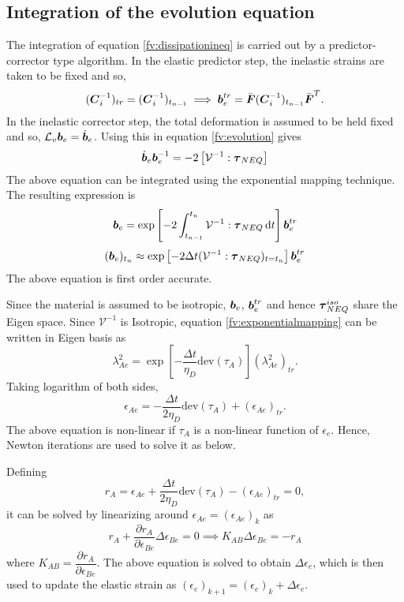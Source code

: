 \documentclass[11pt,twoside,TimesRoman]{article}
\newcommand{\parder}[2]{{\dfrac{\partial #1}{\partial #2}}}
\begin{document}
\subsection{Integration of the evolution equation}
The integration of equation \ref{fv:dissipationineq} is carried out by a predictor-corrector type algorithm. In the elastic predictor step, the inelastic strains are taken to be fixed and so,
\begin{equation}
	(\mbox{\boldmath $C$}_i^{-1})_{tr} = 	(\mbox{\boldmath $C$}_i^{-1})_{t_{n-1}} \implies \mbox{\boldmath $b$}_e^{tr} = \bar{\mbox{\boldmath $F$}} (\mbox{\boldmath $C$}_i^{-1})_{t_{n-1}} \bar{\mbox{\boldmath $F$}}^T.
\end{equation}
In the inelastic corrector step, the total deformation is assumed to be held fixed and so, $\mathcal{L}_v\mbox{\boldmath $b$}_e = \dot{\mbox{\boldmath $b$}}_e$. Using this in equation \ref{fv:evolution} gives
\begin{equation}
	\dot{\mbox{\boldmath $b$}}_e {\mbox{\boldmath $b$}}^{-1}_e = -2 \left[\mathcal{V}^{-1} : \boldsymbol{\tau}_{NEQ} \right]
\end{equation}
The above equation can be integrated using the exponential mapping technique. The resulting expression is 
\begin{equation}
	{\mbox{\boldmath $b$}}_e  = \exp  \left[ -2 \int_{t_{n-1}}^{t_n} \mathcal{V}^{-1} : \boldsymbol{\tau}_{NEQ} \mathop{}\!\mathrm{d} t \right] \mbox{\boldmath $b$}_e^{tr}
\end{equation}
\begin{equation}
	({\mbox{\boldmath $b$}}_e)_{t_n}  \approx \exp  \left[ -2 \Delta t (\mathcal{V}^{-1} : \boldsymbol{\tau}_{NEQ})_{t=t_n} \right] \mbox{\boldmath $b$}_e^{tr}
	\label{fv:exponentialmapping}
\end{equation}
The above equation is first order accurate.

Since the material is assumed to be isotropic, ${\mbox{\boldmath $b$}}_e$, $\mbox{\boldmath $b$}_e^{tr}$ and hence $\mbox{\boldmath $\tau$}_{NEQ}^{iso}$ share the Eigen space. Since $\mathcal{V}^{-1}$ is Isotropic, equation \ref{fv:exponentialmapping} can be written in Eigen basis as
\begin{equation}
	\lambda_{Ae}^2 = \exp \left[- \frac{\Delta t }{\eta_D} \text{dev}(\tau_A) \right]  	(\lambda_{Ae}^2)_{tr}.
\end{equation}
Taking logarithm of both sides,
\begin{equation}
	\epsilon_{Ae} = - \frac{\Delta t }{2 \eta_D} \text{dev}(\tau_A) + 	(\epsilon_{Ae})_{tr}.
\end{equation}
The above equation is non-linear if $\tau_A$ is a non-linear function of $\epsilon_{e}$. Hence, Newton iterations are used to solve it as below.

Defining 
\begin{equation}
	r_A	 = \epsilon_{Ae} + \frac{\Delta t }{2 \eta_D} \text{dev}(\tau_A) - 	(\epsilon_{Ae})_{tr} = 0,
	\label{FV:residualnewtoniter}
\end{equation}
it can be solved by linearizing around $\epsilon_{Ae} = (\epsilon_{Ae})_k$ as
\begin{equation}
r_A + \parder{r_A}{\epsilon_{Be}} \Delta \epsilon_{Be}	 = 0 \implies K_{AB} \Delta \epsilon_{Be}	 = -r_A
\end{equation}
where $K_{AB} = \parder{r_A}{\epsilon_{Be}}$. The above equation is solved to obtain $\Delta \epsilon_{e}$, which is then used to update the elastic strain as $(\epsilon_e)_{k+1} = (\epsilon_e)_{k} + \Delta \epsilon_{e}$.
\end{document}
